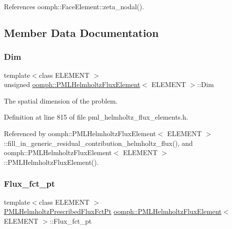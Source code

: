 References oomph\+::\+Face\+Element\+::zeta\+\_\+nodal().



\subsection{Member Data Documentation}
\mbox{\label{classoomph_1_1PMLHelmholtzFluxElement_a827a510a87a761004c8c667a78b3d9fb}} 
\subsubsection{\texorpdfstring{Dim}{Dim}}
{\footnotesize\ttfamily template$<$class E\+L\+E\+M\+E\+NT $>$ \\
unsigned \hyperlink{classoomph_1_1PMLHelmholtzFluxElement}{oomph\+::\+P\+M\+L\+Helmholtz\+Flux\+Element}$<$ E\+L\+E\+M\+E\+NT $>$\+::Dim\hspace{0.3cm}{\ttfamily [protected]}}



The spatial dimension of the problem. 



Definition at line 815 of file pml\+\_\+helmholtz\+\_\+flux\+\_\+elements.\+h.



Referenced by oomph\+::\+P\+M\+L\+Helmholtz\+Flux\+Element$<$ E\+L\+E\+M\+E\+N\+T $>$\+::fill\+\_\+in\+\_\+generic\+\_\+residual\+\_\+contribution\+\_\+helmholtz\+\_\+flux(), and oomph\+::\+P\+M\+L\+Helmholtz\+Flux\+Element$<$ E\+L\+E\+M\+E\+N\+T $>$\+::\+P\+M\+L\+Helmholtz\+Flux\+Element().

\mbox{\label{classoomph_1_1PMLHelmholtzFluxElement_aa4f97625c7e71e7cb935cb5a753d8f9c}} 
\subsubsection{\texorpdfstring{Flux\+\_\+fct\+\_\+pt}{Flux\_fct\_pt}}
{\footnotesize\ttfamily template$<$class E\+L\+E\+M\+E\+NT $>$ \\
\hyperlink{classoomph_1_1PMLHelmholtzFluxElement_af376593418510a6fcbc23cc13f3d6b22}{P\+M\+L\+Helmholtz\+Prescribed\+Flux\+Fct\+Pt} \hyperlink{classoomph_1_1PMLHelmholtzFluxElement}{oomph\+::\+P\+M\+L\+Helmholtz\+Flux\+Element}$<$ E\+L\+E\+M\+E\+NT $>$\+::Flux\+\_\+fct\+\_\+pt\hspace{0.3cm}{\ttfamily [protected]}}




